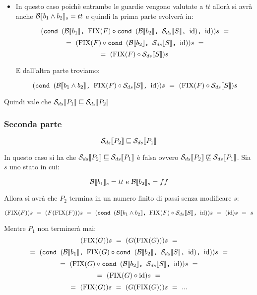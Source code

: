{\begin{itemize}
        \[ (\cond{b_1}{\fixp{F} \circ \cond{b_2}{\Sds}{\idDS}}{\idDS})s~= \]
       \[  =~(\fixp{F} \circ \cond{b_2}{\Sds}{\idDS})s~= \]
       \[  =~(\fixp{F} \circ \idDS)s~=~(\fixp{F})s~=~(F(\fixp{F}))s~= \]
       \[  =~(\cond{b_1\and{}b_2}{\fixp{F} \circ \Sds}{\idDS})s~=~(\idDS)s~=~s \]
       
        E quindi dall'altra parte similmente avremo:
       
        \[ (\cond{b_1\and{}b_2}{\fixp{F} \circ \Sds}{\idDS})s~=~(\idDS)s~=~s \]
   
        \item {} 
        
        In questo
        caso poichè entrambe le guardie vengono valutate a $tt$ allorà si avrà
        anche $\evalBbs{b_1\and{}b_2}{s}=tt$ e quindi la prima parte evolverà
        in:
        
        \[ (\cond{b_1}{\fixp{F} \circ \cond{b_2}{\Sds}{\idDS}}{\idDS})s~= \]
       \[  =~(\fixp{F} \circ \cond{b_2}{\Sds}{\idDS})s~= \]
        \[ =~(\fixp{F} \circ \Sds)s \]
       
        E dall'altra parte troviamo:
       
        \[ (\cond{b_1\and{}b_2}{\fixp{F} \circ \Sds}{\idDS})s~
        =~(\fixp{F} \circ \Sds)s \]
    
    \end{itemize}
    Quindi vale che $\dsCtxt{P_1} \mineq \dsCtxt{P_2}$

    \subsubsection{Seconda parte} 
    \[ \dsCtxt{P_2}  \mineq \dsCtxt{P_1} \]
    
    In questo caso si ha che $\dsCtxt{P_2} \mineq \dsCtxt{P_1}$ è falsa ovvero
    $\dsCtxt{P_2} \notmineq \dsCtxt{P_1}$. Sia $s$ uno stato in cui:

    \[ \evalBbs{b_1}{s}=tt $ e $ \evalBbs{b_2}{s}=ff \]
   
    Allora si avrà che $P_2$ termina in un numero finito di passi senza
    modificare $s$:
    
    \[ (\fixp{F})s~=~(F(\fixp{F}))s~=~
    (\cond{b_1\and{}b_2}{\fixp{F} \circ \Sds}{\idDS})s~=~(\idDS)s~=~s \]
    
    Mentre $P_1$ non terminerà mai:
    \[ (\fixp{G})s~=~(G(\fixp{G}))s~= \]
    \[ =~(\cond{b_1}{\fixp{G} \circ \cond{b_2}{\Sds}{\idDS}}{\idDS})s~= \]
    \[ =~(\fixp{G} \circ \cond{b_2}{\Sds}{\idDS})s~= \]
    \[ =~(\fixp{G} \circ \idDS)s~= \]
    \[ =~ (\fixp{G})s~=~(G(\fixp{G}))s~=~... \]
   
}
\newpage